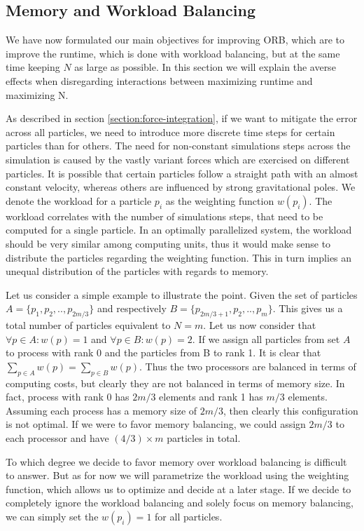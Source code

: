 \documentclass[]{article}
\begin{document}
\subsection{Memory and Workload Balancing}\label{balancing}
We have now formulated our main objectives for improving ORB, which are to improve the runtime, which is done with workload balancing, but at the same time keeping $N$ as large as possible. In this section we will explain the averse effects when disregarding interactions between maximizing runtime and maximizing N.


As described in section \ref{section:force-integration}, if we want to mitigate the error across all particles, we need to introduce more discrete time steps for certain particles than for others. The need for non-constant simulations steps across the simulation is caused by the vastly variant forces which are exercised on different particles. It is possible that certain particles follow a straight path with an almost constant velocity, whereas others are influenced by strong gravitational poles. We denote the workload for a particle $p_i$ as the weighting function $w(p_i)$. The workload correlates with the number of simulations steps, that need to be computed for a single particle. In an optimally parallelized system, the workload should be very similar among computing units, thus it would make sense to distribute the particles regarding the weighting function. This in turn implies an unequal distribution of the particles with regards to memory.

Let us consider a simple example to illustrate the point. Given the set of particles $A = \{p_1, p_2, .., p_{2m/3}\}$ and respectively $B = \{p_{2m/3 + 1}, p_2, .., p_{m}\}$. This gives us a total number of particles equivalent to $N = m$. Let us now consider that $\forall p \in A : w(p) = 1$ and $\forall p \in B : w(p) = 2$. If we assign all particles from set $A$ to process with rank 0 and the particles from B to rank 1. It is clear that $\sum_{p\in A} w(p) = \sum_{p\in B} w(p)$. Thus the two processors are balanced in terms of computing costs, but clearly they are not balanced in terms of memory size. In fact, process with rank 0 has $2m/3$ elements and rank 1 has $m/3$ elements. Assuming each process has a memory size of $2m/3$, then clearly this configuration is not optimal. If we were to favor memory balancing, we could assign $2m/3$ to each processor and have $(4/3) \times m$ particles in total. 

To which degree we decide to favor memory over workload balancing is difficult to answer. But as for now we will parametrize the workload using the weighting function, which allows us to optimize and decide at a later stage. If we decide to completely ignore the workload balancing and solely focus on memory balancing, we can simply set the $w(p_i) = 1$ for all particles.
\end{document}
